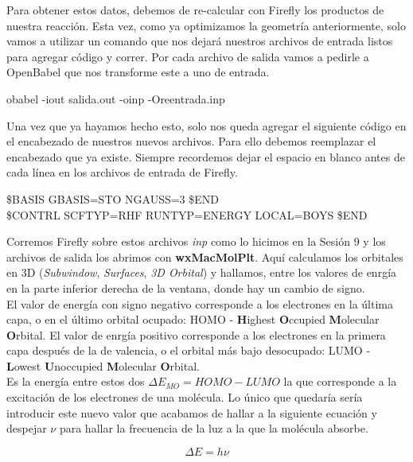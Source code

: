 \documentclass[10pt,letterpaper]{article}
\newenvironment{Code}
{
\begin{lrbox}{\selvestebox}%
\begin{minipage}{\dimexpr\columnwidth-2\fboxsep\relax}
\fontfamily{\ttdefault}\selectfont
}
{\end{minipage}\end{lrbox}%
\begin{center}
\colorbox{light-gray}{\usebox{\selvestebox}}
\end{center}
}
\begin{document}
Para obtener estos datos, debemos de re-calcular con Firefly los productos de nuestra reacci\'on. Esta vez, como ya optimizamos la geometr\'ia anteriormente, solo vamos a utilizar un comando que nos dejar\'a nuestros archivos de entrada listos para agregar c\'odigo y correr. Por cada archivo de salida vamos a pedirle a OpenBabel que nos transforme este a uno de entrada.

\begin{Code}
obabel -iout salida.out -oinp -Oreentrada.inp
\end{Code}

Una vez que ya hayamos hecho esto, solo nos queda agregar el siguiente c\'odigo en el encabezado de nuestros nuevos archivos. Para ello debemos reemplazar el encabezado que ya existe. Siempre recordemos dejar el espacio en blanco antes de cada l\'inea en los archivos de entrada de Firefly.

\begin{Code}
\$BASIS GBASIS=STO NGAUSS=3 \$END\\
\$CONTRL SCFTYP=RHF RUNTYP=ENERGY LOCAL=BOYS \$END
\end{Code}

Corremos Firefly sobre estos archivos \textit{inp} como lo hicimos en la Sesi\'on 9 y los archivos de salida los abrimos con \textbf{wxMacMolPlt}. Aqu\'i calculamos los orbitales en 3D (\textit{Subwindow}, \textit{Surfaces}, \textit{3D Orbital}) y hallamos, entre los valores de enrg\'ia en la parte inferior derecha de la ventana, donde hay un cambio de signo.\\

El valor de energ\'ia con signo negativo corresponde a los electrones en la \'ultima capa, o en el \'ultimo orbital ocupado: HOMO - \textbf{H}ighest \textbf{O}ccupied \textbf{M}olecular \textbf{O}rbital. El valor de enrg\'ia positivo corresponde a los electrones en la primera capa despu\'es de la de valencia, o el orbital m\'as bajo desocupado: LUMO - \textbf{L}owest \textbf{U}noccupied \textbf{M}olecular \textbf{O}rbital.\\

Es la energ\'ia entre estos dos $\Delta E_{MO} = HOMO - LUMO$ la que corresponde a la excitaci\'on de los electrones de una mol\'ecula. Lo \'unico que quedar\'ia ser\'ia introducir este nuevo valor que acabamos de hallar a la siguiente ecuaci\'on y despejar $\nu$ para hallar la frecuencia de la luz a la que la mol\'ecula absorbe.

\begin{equation}
\Delta E = h \nu
\end{equation}
\end{document}
